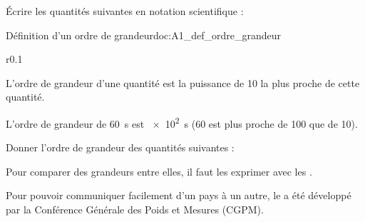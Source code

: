 \numeroQuestion Écrire les quantités suivantes en notation scientifique :
  



\begin{doc}{Définition d'un ordre de grandeur}{doc:A1_def_ordre_grandeur}
  \begin{wrapfigure}[3]{r}{0.1\linewidth}
    \vspace*{-32pt}
  \end{wrapfigure}

  \vAligne{-36pt}
  \begin{encart}
    L'ordre de grandeur d'une quantité est la puissance de 10 la plus proche de cette quantité.
  \end{encart}
  \exemple L'ordre de grandeur de \qty{60}{\s} est \qty{e2}{\s} (60 est plus proche de 100 que de 10). 
\end{doc}

\numeroQuestion Donner l'ordre de grandeur des quantités suivantes :




\vspace*{-12pt}

Pour comparer des grandeurs entre elles, il faut les exprimer avec les . %

Pour pouvoir communiquer facilement d'un pays à un autre, le  a été développé par la Conférence Générale des Poids et Mesures (CGPM). %

